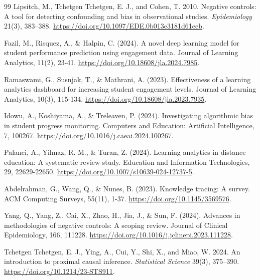 \begin{thebibliography}{99}
Lipsitch, M., Tchetgen Tchetgen, E. J., and Cohen, T. 2010. Negative controls: A tool for detecting confounding and bias in observational studies. \textit{Epidemiology} 21(3), 383--388. \url{https://doi.org/10.1097/EDE.0b013e3181d61eeb}.

Fazil, M., Risquez, A., \& Halpin, C. (2024). A novel deep learning model for student performance prediction using engagement data. Journal of Learning Analytics, 11(2), 23-41. \url{https://doi.org/10.18608/jla.2024.7985}.

Ramaswami, G., Susnjak, T., \& Mathrani, A. (2023). Effectiveness of a learning analytics dashboard for increasing student engagement levels. Journal of Learning Analytics, 10(3), 115-134. \url{https://doi.org/10.18608/jla.2023.7935}.

Idowu, A., Koshiyama, A., \& Treleaven, P. (2024). Investigating algorithmic bias in student progress monitoring. Computers and Education: Artificial Intelligence, 7, 100267. \url{https://doi.org/10.1016/j.caeai.2024.100267}.

Palanci, A., Yilmaz, R. M., \& Turan, Z. (2024). Learning analytics in distance education: A systematic review study. Education and Information Technologies, 29, 22629-22650. \url{https://doi.org/10.1007/s10639-024-12737-5}.

Abdelrahman, G., Wang, Q., \& Nunes, B. (2023). Knowledge tracing: A survey. ACM Computing Surveys, 55(11), 1-37. \url{https://doi.org/10.1145/3569576}.

Yang, Q., Yang, Z., Cai, X., Zhao, H., Jia, J., \& Sun, F. (2024). Advances in methodologies of negative controls: A scoping review. Journal of Clinical Epidemiology, 166, 111228. \url{https://doi.org/10.1016/j.jclinepi.2023.111228}.

Tchetgen Tchetgen, E. J., Ying, A., Cui, Y., Shi, X., and Miao, W. 2024. An introduction to proximal causal inference. \textit{Statistical Science} 39(3), 375--390. \url{https://doi.org/10.1214/23-STS911}.


\end{thebibliography}
